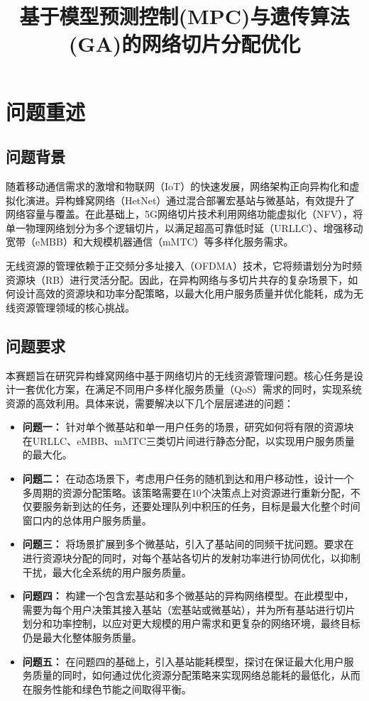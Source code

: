 \documentclass[withoutpreface,bwprint]{cumcmthesis}
\title{基于模型预测控制(MPC)与遗传算法(GA)的网络切片分配优化}  %
\begin{document}
\maketitle


\tableofcontents  %
\newpage

\section{问题重述}
\subsection{问题背景}
随着移动通信需求的激增和物联网（IoT）的快速发展，网络架构正向异构化和虚拟化演进。异构蜂窝网络（HetNet）通过混合部署宏基站与微基站，有效提升了网络容量与覆盖。在此基础上，5G网络切片技术利用网络功能虚拟化（NFV），将单一物理网络划分为多个逻辑切片，以满足超高可靠低时延（URLLC）、增强移动宽带（eMBB）和大规模机器通信（mMTC）等多样化服务需求。

无线资源的管理依赖于正交频分多址接入（OFDMA）技术，它将频谱划分为时频资源块（RB）进行灵活分配。因此，在异构网络与多切片共存的复杂场景下，如何设计高效的资源块和功率分配策略，以最大化用户服务质量并优化能耗，成为无线资源管理领域的核心挑战。

\subsection{问题要求}
本赛题旨在研究异构蜂窝网络中基于网络切片的无线资源管理问题。核心任务是设计一套优化方案，在满足不同用户多样化服务质量（QoS）需求的同时，实现系统资源的高效利用。具体来说，需要解决以下几个层层递进的问题：

\begin{itemize}
    \item \textbf{问题一：} 针对单个微基站和单一用户任务的场景，研究如何将有限的资源块在URLLC、eMBB、mMTC三类切片间进行静态分配，以实现用户服务质量的最大化。
    \item \textbf{问题二：} 在动态场景下，考虑用户任务的随机到达和用户移动性，设计一个多周期的资源分配策略。该策略需要在10个决策点上对资源进行重新分配，不仅要服务新到达的任务，还要处理队列中积压的任务，目标是最大化整个时间窗口内的总体用户服务质量。
    \item \textbf{问题三：} 将场景扩展到多个微基站，引入了基站间的同频干扰问题。要求在进行资源块分配的同时，对每个基站各切片的发射功率进行协同优化，以抑制干扰，最大化全系统的用户服务质量。
    \item \textbf{问题四：} 构建一个包含宏基站和多个微基站的异构网络模型。在此模型中，需要为每个用户决策其接入基站（宏基站或微基站），并为所有基站进行切片划分和功率控制，以应对更大规模的用户需求和更复杂的网络环境，最终目标仍是最大化整体服务质量。
    \item \textbf{问题五：} 在问题四的基础上，引入基站能耗模型，探讨在保证最大化用户服务质量的同时，如何通过优化资源分配策略来实现网络总能耗的最低化，从而在服务性能和绿色节能之间取得平衡。
\end{itemize}
\end{document}
